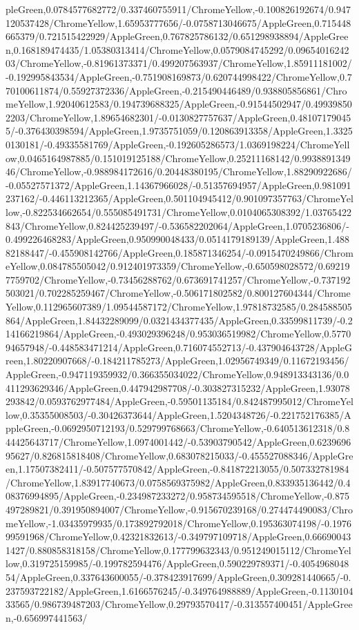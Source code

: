 {\begin{tikzternal}
pleGreen,0.0784577682772/0.337460755911/ChromeYellow,-0.100826192674/0.947120537428/ChromeYellow,1.65953777656/-0.0758713046675/AppleGreen,0.715448665379/0.721515422929/AppleGreen,0.767825786132/0.651298938894/AppleGreen,0.168189474435/1.05380313414/ChromeYellow,0.0579084745292/0.0965401624203/ChromeYellow,-0.81961373371/0.499207563937/ChromeYellow,1.85911181002/-0.192995843534/AppleGreen,-0.751908169873/0.620744998422/ChromeYellow,0.770100611874/0.55927372336/AppleGreen,-0.215490446489/0.938805856861/ChromeYellow,1.92040612583/0.194739688325/AppleGreen,-0.91544502947/0.499398502203/ChromeYellow,1.89654682301/-0.0130827757637/AppleGreen,0.481071790455/-0.376430398594/AppleGreen,1.9735751059/0.120863913358/AppleGreen,1.33250130181/-0.49335581769/AppleGreen,-0.192605286573/1.0369198224/ChromeYellow,0.0465164987885/0.151019125188/ChromeYellow,0.25211168142/0.993889134946/ChromeYellow,-0.988984172616/0.20448380195/ChromeYellow,1.88290922686/-0.05527571372/AppleGreen,1.14367966028/-0.51357694957/AppleGreen,0.981091237162/-0.446113212365/AppleGreen,0.501104945412/0.901097357763/ChromeYellow,-0.822534662654/0.555085491731/ChromeYellow,0.0104065308392/1.03765422843/ChromeYellow,0.824425239497/-0.536582202064/AppleGreen,1.0705236806/-0.499226468283/AppleGreen,0.950990048433/0.0514179189139/AppleGreen,1.48882188447/-0.455908142766/AppleGreen,0.185871346254/-0.0915470249866/ChromeYellow,0.084785505042/0.912401973359/ChromeYellow,-0.650598028572/0.692197759702/ChromeYellow,-0.73456288762/0.673691741257/ChromeYellow,-0.737192503021/0.702285259467/ChromeYellow,-0.506171802582/0.800127604344/ChromeYellow,0.112965607389/1.09544587172/ChromeYellow,1.97818732585/0.284588505864/AppleGreen,1.84432289099/0.0321434377435/AppleGreen,0.33599811739/-0.214166219864/AppleGreen,-0.493029396248/0.953036519982/ChromeYellow,0.577094657948/-0.448583471214/AppleGreen,0.716074552713/-0.437904643728/AppleGreen,1.80220907668/-0.184211785273/AppleGreen,1.02956749349/0.11672193456/AppleGreen,-0.947119359932/0.366355034022/ChromeYellow,0.948913343136/0.0411293629346/AppleGreen,0.447942987708/-0.303827315232/AppleGreen,1.93078293842/0.0593762977484/AppleGreen,-0.59501135184/0.842487995012/ChromeYellow,0.35355008503/-0.30426373644/AppleGreen,1.5204348726/-0.221752176385/AppleGreen,-0.0692950712193/0.529799768663/ChromeYellow,-0.640513612318/0.844425643717/ChromeYellow,1.0974001442/-0.53903790542/AppleGreen,0.623969695627/0.826815818408/ChromeYellow,0.683078215033/-0.455527088346/AppleGreen,1.17507382411/-0.507577570842/AppleGreen,-0.841872213055/0.507332781984/ChromeYellow,1.83917740673/0.0758569375982/AppleGreen,0.833935136442/0.408376994895/AppleGreen,-0.234987233272/0.958734595518/ChromeYellow,-0.875497289821/0.391950894007/ChromeYellow,-0.915670239168/0.274474490083/ChromeYellow,-1.03435979935/0.173892792018/ChromeYellow,0.195363074198/-0.197699591968/ChromeYellow,0.42321832613/-0.349797109718/AppleGreen,0.666900431427/0.880858318158/ChromeYellow,0.177799632343/0.951249015112/ChromeYellow,0.319725159985/-0.199782594476/AppleGreen,0.590229789371/-0.405496804854/AppleGreen,0.337643600055/-0.378423917699/AppleGreen,0.309281440665/-0.237593722182/AppleGreen,1.6166576245/-0.349764988889/AppleGreen,-0.113010433565/0.986739487203/ChromeYellow,0.29793570417/-0.313557400451/AppleGreen,-0.656997441563/
\end{tikzternal}}
